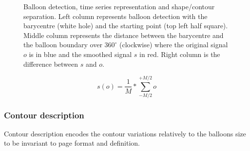 	\begin{figure}[!ht]	%
	  \centering
		\caption[Balloon contour time series]{Balloon detection, time series representation and shape/contour separation. Left column represents balloon detection with the barycentre (white hole) and the starting point (top left half square). Middle column represents the distance between the barycentre and the balloon boundary over $360^\circ$ (clockwise) where the original signal $o$ is in blue and the smoothed signal $s$ in red. Right column is the difference between $s$ and $o$.}
		\label{fig:be:time_series}
	\end{figure}

\begin{equation}
\label{eq:be:smooth}
 s(o) = \frac{1}{M} * \sum_{-M/2}^{+M/2} o
\end{equation}



\subsubsection{Contour description}
\label{sec:be:description}

Contour description encodes the contour variations relatively to the balloons size to be invariant to page format and definition.

